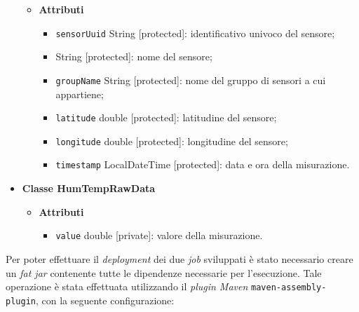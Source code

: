 \begin{itemize}
\begin{itemize}
		      \item \textbf{Attributi}
		            \begin{itemize}
			            \item \texttt{sensorUuid} String [protected]: identificativo univoco del sensore;
			            \item \texttt{} String [protected]: nome del sensore;
			            \item \texttt{groupName} String [protected]: nome del gruppo di sensori a cui appartiene;
			            \item \texttt{latitude} double [protected]: latitudine del sensore;
			            \item \texttt{longitude} double [protected]: longitudine del sensore;
			            \item \texttt{timestamp} LocalDateTime [protected]: data e ora della misurazione.
		            \end{itemize}
	      \end{itemize}
	\item \textbf{Classe HumTempRawData}
	      \begin{itemize}
		      \item \textbf{Attributi}
		            \begin{itemize}
			            \item \texttt{value} double [private]: valore della misurazione.
		            \end{itemize}
	      \end{itemize}
\end{itemize}

Per poter effettuare il \textit{deployment} dei due \textit{job} sviluppati è stato necessario creare un \textit{fat jar} contenente tutte le dipendenze necessarie per l'esecuzione.
Tale operazione è stata effettuata utilizzando il \textit{plugin Maven} \texttt{maven-assembly-plugin}, con la seguente configurazione:

